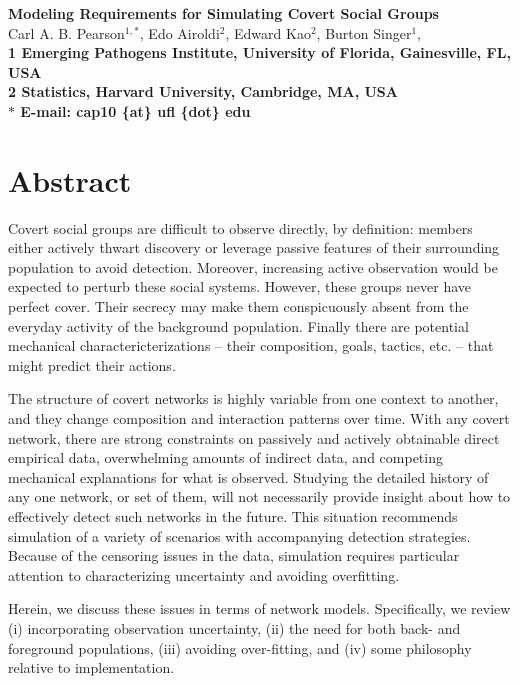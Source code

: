 \documentclass{article}
\begin{document}

\begin{flushleft}
{\Large
\textbf{Modeling Requirements for Simulating Covert Social Groups}
}
\\
Carl A. B. Pearson$^{1,\ast}$, 
Edo Airoldi$^{2}$,
Edward Kao$^{2}$,
Burton Singer$^{1}$, 
\\
\bf{1} Emerging Pathogens Institute, University of Florida, Gainesville, FL, USA
\\
\bf{2} Statistics, Harvard University, Cambridge, MA, USA
\\
$\ast$ E-mail: cap10 \{at\} ufl \{dot\} edu
\end{flushleft}
\section*{Abstract}
Covert social groups are difficult to observe directly, by definition: members either actively thwart discovery or leverage passive features of their surrounding population to avoid detection.  Moreover, increasing active observation would be expected to perturb these social systems.  However, these groups never have perfect cover.  Their secrecy may make them conspicuously absent from the everyday activity of the background population.  Finally there are potential mechanical charactericterizations -- their composition, goals, tactics, etc. -- that might predict their actions.

The structure of covert networks is highly variable from one context to another, and they change composition and interaction patterns over time.  With any covert network, there are strong constraints on passively and actively obtainable direct empirical data, overwhelming amounts of indirect data, and competing mechanical explanations for what is observed.  Studying the detailed history of any one network, or set of them, will not necessarily provide insight about how to effectively detect such networks in the future.  This situation recommends simulation of a variety of scenarios with accompanying detection strategies. Because of the censoring issues in the data, simulation requires particular attention to characterizing uncertainty and avoiding overfitting.

Herein, we discuss these issues in terms of network models.  Specifically, we review (i) incorporating observation uncertainty, (ii) the need for both back- and foreground populations, (iii) avoiding over-fitting, and (iv) some philosophy relative to implementation.
\end{document}
